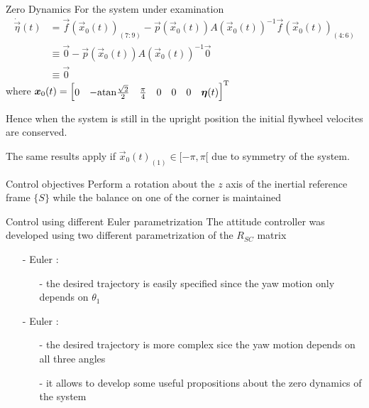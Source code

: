 \begin{frame}{Zero Dynamics \cubli}
  For the system under examination
  \[
  \begin{split}
    \dot{\vec{\eta}}(t) &= \vec{f}(\vec{x}_{0}(t))_{(7:9)} - \vec{p}
    (\vec{x}_{0}(t))A(\vec{x}_{0}(t))^{-1}  \vec{f}(\vec{x}_{0}(t))_{(4:6)}\\
    &\equiv \vec{0} - \vec{p}
    (\vec{x}_{0}(t))A(\vec{x}_{0}(t))^{-1}  \vec{0}\\
    &\equiv \vec{0}
  \end{split}
  \]
  where $\boldsymbol{x}_{0}(t)=
  \begin{bmatrix}
    0 & -\mathrm{atan}\frac{\sqrt{2}}{2} & \frac{\pi}{4} & 0 & 0 & 0 &
    \boldsymbol{\eta}(t)
  \end{bmatrix}^{\mathrm{T}}
  $
  \par
  Hence when the system is still in the upright position the initial flywheel velocites
  are conserved.
  \par
  The same results apply if $\vec{x}_{0}(t)_{(1)} \in [-\pi, \pi[$ due to symmetry of the system.
\end{frame}

\begin{frame}{Control objectives}
  Perform a rotation about the $z$ axis of the inertial
  reference frame $\{S\}$ while the balance on one of the corner is maintained
  \begin{center}
  \end{center}
\end{frame}

\begin{frame}{Control using different Euler parametrization}
  The attitude controller was developed using two different parametrization of the $R_{SC}$ matrix
  \begin{itemize}
  \item[-] Euler \color{dgreen}{ZYX}:  
    \begin{itemize}
    \item[-] the desired trajectory is easily specified since the yaw motion \alert{only} depends on $\theta_1$
    \end{itemize}
  \item[-] Euler \color{red}{XYZ}:
    \begin{itemize}
    \item[-] the desired trajectory is more complex sice the yaw motion depends on  \alert{all} three angles
    \item[-] it allows to develop some useful propositions about the zero dynamics of the system
    \end{itemize}
  \end{itemize}
\end{frame}

